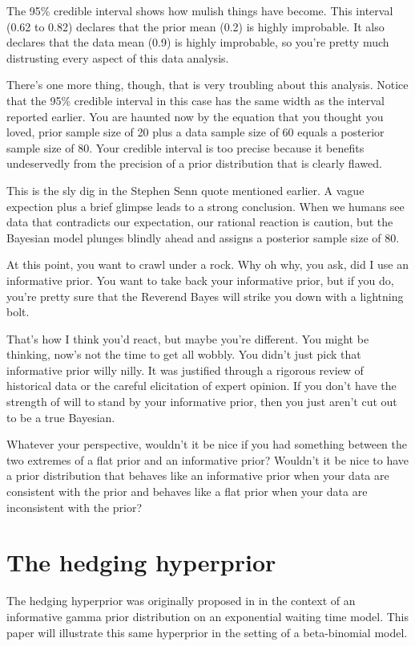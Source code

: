 \documentclass[12pt]{article}
\begin{document}
The 95\% credible interval shows how mulish things have become. This interval (0.62 to 0.82) declares that the prior mean (0.2) is highly improbable. It also declares that the data mean (0.9) is highly improbable, so you're pretty much distrusting every aspect of this data analysis.

There's one more thing, though, that is very troubling about this analysis. Notice that the 95\% credible interval in this case has the same width as the interval reported earlier. You are haunted now by the equation that you thought you loved, prior sample size of 20 plus a data sample size of 60 equals a posterior sample size of 80. Your credible interval is too precise because it benefits undeservedly from the precision of a prior distribution that is clearly flawed. 

This is the sly dig in the Stephen Senn quote mentioned earlier. A vague expection plus a brief glimpse leads to a strong conclusion. When we humans see data that contradicts our expectation, our rational reaction is caution, but the Bayesian model plunges blindly ahead and assigns a posterior sample size of 80.

At this point, you want to crawl under a rock. Why oh why, you ask, did I use an informative prior. You want to take back your informative prior, but if you do, you're pretty sure that the Reverend Bayes will strike you down with a lightning bolt.

That's how I think you'd react, but maybe you're different. You might be thinking, now's not the time to get all wobbly. You didn't just pick that informative prior willy nilly. It was justified through a rigorous review of historical data or the careful elicitation of expert opinion. If you don't have the strength of will to stand by your informative prior, then you just aren't cut out to be a true Bayesian.

Whatever your perspective, wouldn't it be nice if you had something between the two extremes of a flat prior and an informative prior? Wouldn't it be nice to have a prior distribution that behaves like an informative prior when your data are consistent with the prior and behaves like a flat prior when your data are inconsistent with the prior?

\section{The hedging hyperprior}
\label{sec:hh}

The hedging hyperprior was originally proposed in \cite{jiang15} in the context of an informative gamma prior distribution on an exponential waiting time model. This paper will illustrate this same hyperprior in the setting of a beta-binomial model.
\end{document}
